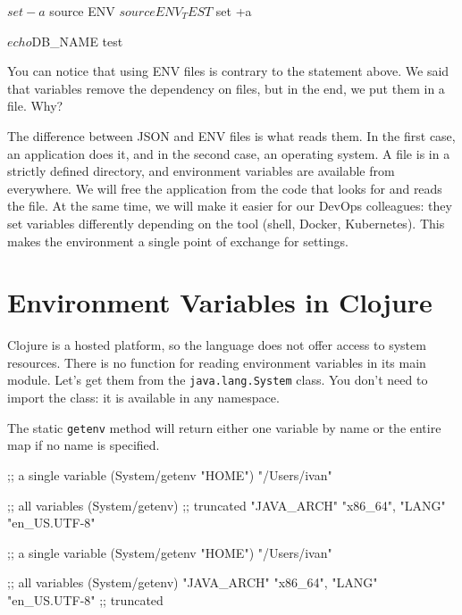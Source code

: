 \begin{bash}
$ set -a
$ source ENV
$ source ENV_TEST
$ set +a

$ echo $DB_NAME
test
\end{bash}

You can notice that using ENV files is contrary to the statement above. We said that variables remove the dependency on files, but in the end, we put them in a file. Why?


The difference between JSON and ENV files is what reads them. In the first case, an application does it, and in the second case, an operating system. A file is in a strictly defined directory, and environment variables are available from everywhere. We will free the application from the code that looks for and reads the file. At the same time, we will make it easier for our DevOps colleagues: they set variables differently depending on the tool (shell, Docker, Kubernetes). This makes the environment a single point of exchange for settings.

\section{ Environment Variables in Clojure}


Clojure is a hosted platform, so the language does not offer access to system resources. There is no function for reading environment variables in its main module. Let's get them from the \verb|java.lang.System| class. You don't need to import the class: it is available in any namespace.

The static \verb|getenv| method will return either one variable by name or the entire map if no name is specified.

\ifx\DEVICETYPE\MOBILE

\begin{clojure}
;; a single variable
(System/getenv "HOME")
"/Users/ivan"

;; all variables
(System/getenv)
;; truncated
{"JAVA_ARCH" "x86_64",
 "LANG" "en_US.UTF-8"}
\end{clojure}

\else

\begin{clojure}
;; a single variable
(System/getenv "HOME")
"/Users/ivan"

;; all variables
(System/getenv)
{"JAVA_ARCH" "x86_64", "LANG" "en_US.UTF-8"} ;; truncated
\end{clojure}

